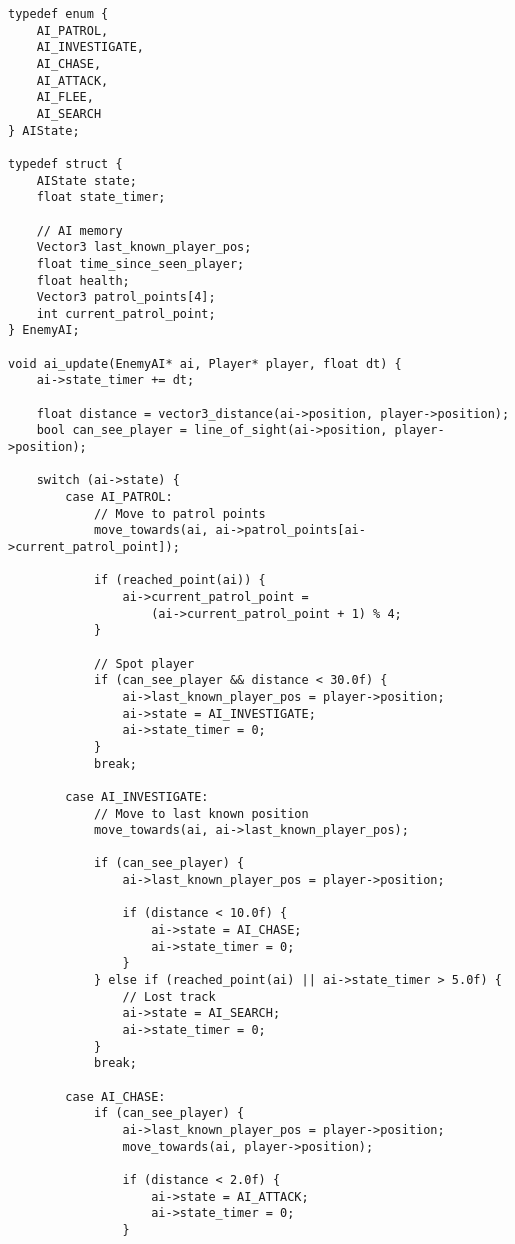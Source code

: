 \begin{lstlisting}
typedef enum {
    AI_PATROL,
    AI_INVESTIGATE,
    AI_CHASE,
    AI_ATTACK,
    AI_FLEE,
    AI_SEARCH
} AIState;

typedef struct {
    AIState state;
    float state_timer;

    // AI memory
    Vector3 last_known_player_pos;
    float time_since_seen_player;
    float health;
    Vector3 patrol_points[4];
    int current_patrol_point;
} EnemyAI;

void ai_update(EnemyAI* ai, Player* player, float dt) {
    ai->state_timer += dt;

    float distance = vector3_distance(ai->position, player->position);
    bool can_see_player = line_of_sight(ai->position, player->position);

    switch (ai->state) {
        case AI_PATROL:
            // Move to patrol points
            move_towards(ai, ai->patrol_points[ai->current_patrol_point]);

            if (reached_point(ai)) {
                ai->current_patrol_point =
                    (ai->current_patrol_point + 1) % 4;
            }

            // Spot player
            if (can_see_player && distance < 30.0f) {
                ai->last_known_player_pos = player->position;
                ai->state = AI_INVESTIGATE;
                ai->state_timer = 0;
            }
            break;

        case AI_INVESTIGATE:
            // Move to last known position
            move_towards(ai, ai->last_known_player_pos);

            if (can_see_player) {
                ai->last_known_player_pos = player->position;

                if (distance < 10.0f) {
                    ai->state = AI_CHASE;
                    ai->state_timer = 0;
                }
            } else if (reached_point(ai) || ai->state_timer > 5.0f) {
                // Lost track
                ai->state = AI_SEARCH;
                ai->state_timer = 0;
            }
            break;

        case AI_CHASE:
            if (can_see_player) {
                ai->last_known_player_pos = player->position;
                move_towards(ai, player->position);

                if (distance < 2.0f) {
                    ai->state = AI_ATTACK;
                    ai->state_timer = 0;
                }


\end{lstlisting}
